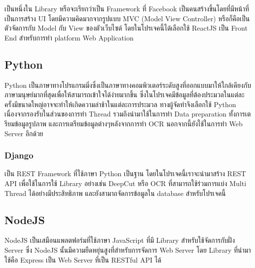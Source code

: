 เป็นหนึ่งใน Library หรือจะเรียกว่าเป็น Framework ที่ Facebook  เป็นคนสร้างขึ้นโดยที่มีหน้าที่เป็นการสร้าง UI โดยมีความคิดมากจากรูปแบบ MVC \cite{techterms} (Model View Controller) หรือก็คือเป็นตัวจัดการกับ Model กับ View ของตัวเว็บไซต์ โดยในโปรเจคนี้ได้เลือกใช้ ReactJS เป็น Front End สำหรับการทำ platform Web Application 

\subsection{Python}

Python เป็นภาษาทางโปรแกรมมิ่งซึ่งเป็นภาษาทางคอมพิวเตอร์ระดับสูงที่ออกแบบมาให้ใกล้เคียงกับภาษามนุษย์มากที่สุดเพื่อให้สามารถเข้าใจได้ง่ายมากขึ้น ซึ่งในโปรเจคมีข้อมูลที่ต้องประมวลในแต่ละครั้งมีขนาดใหญ่อาจจะทำให้เกิดความล่าช้าในแต่ละการประมวล ทางผู้จัดทำจึงเลือกใช้ Python เนื่องจากรองรับในส่วนของการทำ Thread รวมถึงนำมาใช้ในการทำ Data preparation ทั้งการเตรียมข้อมูลรูปภาพ และการเตรียมข้อมูลต่างๆหลังจากการทำ OCR นอกจากนี้ยังใช้ในการทำ Web Server อีกด้วย 

\subsubsection{Django}

เป็น REST Framework ที่ใช้ภาษา Python เป็นฐาน โดยในโปรเจคนี้เราจะนำมาสร้าง REST API  เพื่อใช้ในการใช้ Library อย่างเช่น DeepCut หรือ OCR ที่สามารถใช้ร่วมการแบ่ง Multi Thread ได้อย่างมีประสิทธิภาพ และยังสามาถจัดการข้อมูลใน database สำหรับโปรเจคนี้

\subsection{NodeJS}

NodeJS เป็นเสมือนแพลตฟอร์มที่ใช้ภาษา JavaScript ที่มี Library สำหรับใช้จัดการกับฝั่ง Server ซึ่ง NodeJS นั้นมีความยืดหยุ่นสูงที่สำหรับการจัดการ Web Server โดย Library ที่นำมาใช้คือ Express เป็น Web Server ที่เป็น RESTful API ได้